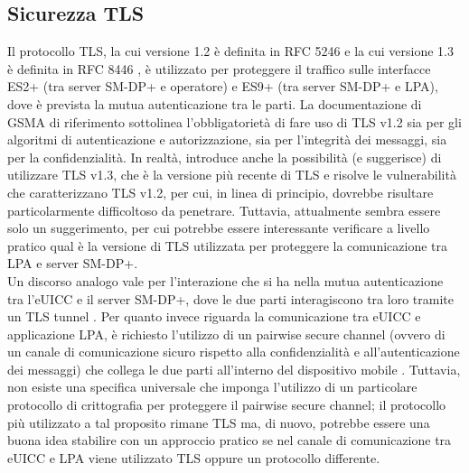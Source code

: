 \documentclass[10pt, oneside]{book}
\begin{document}
\subsection{Sicurezza TLS}
Il protocollo TLS, la cui versione 1.2 è definita in RFC 5246 \cite{RFC-5246} e la cui versione 1.3 è definita in RFC 8446 \cite{RFC-8446}, è utilizzato per proteggere il traffico sulle interfacce ES2+ (tra server SM-DP+ e operatore) e ES9+ (tra server SM-DP+ e LPA), dove è prevista la mutua autenticazione tra le parti. La documentazione di GSMA di riferimento \cite{GSMA-docs-new} sottolinea l'obbligatorietà di fare uso di TLS v1.2 sia per gli algoritmi di autenticazione e autorizzazione, sia per l'integrità dei messaggi, sia per la confidenzialità. In realtà, introduce anche la possibilità (e suggerisce) di utilizzare TLS v1.3, che è la versione più recente di TLS e risolve le vulnerabilità che caratterizzano TLS v1.2, per cui, in linea di principio, dovrebbe risultare particolarmente difficoltoso da penetrare. Tuttavia, attualmente sembra essere solo un suggerimento, per cui potrebbe essere interessante verificare a livello pratico qual è la versione di TLS utilizzata per proteggere la comunicazione tra LPA e server SM-DP+.\\
Un discorso analogo vale per l'interazione che si ha nella mutua autenticazione tra l'eUICC e il server SM-DP+, dove le due parti interagiscono tra loro tramite un TLS tunnel \cite{Sec-analysis}. Per quanto invece riguarda la comunicazione tra eUICC e applicazione LPA, è richiesto l'utilizzo di un pairwise secure channel (ovvero di un canale di comunicazione sicuro rispetto alla confidenzialità e all'autenticazione dei messaggi) che collega le due parti all'interno del dispositivo mobile \cite{Sec-analysis}. Tuttavia, non esiste una specifica universale che imponga l'utilizzo di un particolare protocollo di crittografia per proteggere il pairwise secure channel; il protocollo più utilizzato a tal proposito rimane TLS ma, di nuovo, potrebbe essere una buona idea stabilire con un approccio pratico se nel canale di comunicazione tra eUICC e LPA viene utilizzato TLS oppure un protocollo differente.
\end{document}
